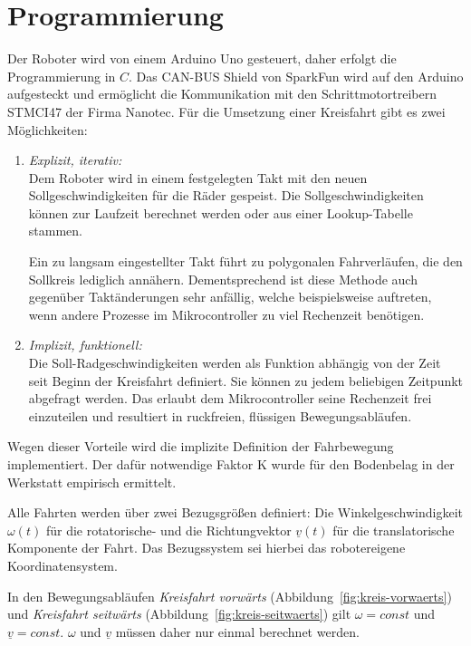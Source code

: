\documentclass[a4paper]{article}
\begin{document}
\section{Programmierung}
Der Roboter wird von einem Arduino Uno gesteuert, daher erfolgt die Programmierung in $C$. Das CAN-BUS Shield von SparkFun wird auf den Arduino aufgesteckt und ermöglicht die Kommunikation mit den Schrittmotortreibern STMCI47 der Firma Nanotec.
Für die Umsetzung einer Kreisfahrt gibt es zwei Möglichkeiten:

\begin{enumerate}
\item \emph{Explizit, iterativ:} \\
Dem Roboter wird in einem festgelegten Takt mit den neuen Sollgeschwindigkeiten für die Räder gespeist. Die Sollgeschwindigkeiten können zur Laufzeit berechnet werden oder aus einer Lookup-Tabelle stammen.

Ein zu langsam eingestellter Takt führt zu polygonalen Fahrverläufen, die den Sollkreis lediglich annähern. Dementsprechend ist diese Methode auch gegenüber Taktänderungen sehr anfällig, welche beispielsweise auftreten, wenn andere Prozesse im Mikrocontroller zu viel Rechenzeit benötigen.

\item \emph{Implizit, funktionell:} \\
Die Soll-Radgeschwindigkeiten werden als Funktion abhängig von der Zeit seit Beginn der Kreisfahrt definiert. Sie können zu jedem beliebigen Zeitpunkt abgefragt werden. Das erlaubt dem Mikrocontroller seine Rechenzeit frei einzuteilen und resultiert in ruckfreien, flüssigen Bewegungsabläufen.
\end{enumerate}

Wegen dieser Vorteile wird die implizite Definition der Fahrbewegung implementiert.
Der dafür notwendige Faktor K wurde für den Bodenbelag in der Werkstatt empirisch ermittelt.

Alle Fahrten werden über zwei Bezugsgrößen definiert: Die Winkelgeschwindigkeit $\omega(t)$ für die rotatorische- und die Richtungvektor $\underline{v}(t)$ für die translatorische Komponente der Fahrt. Das Bezugssystem sei hierbei das robotereigene Koordinatensystem.

In den Bewegungsabläufen \emph{Kreisfahrt vorwärts} (Abbildung~\ref{fig:kreis-vorwaerts}) und \emph{Kreisfahrt seitwärts} (Abbildung~\ref{fig:kreis-seitwaerts}) gilt $\omega = const$ und $\underline{v} = const$. $\omega$ und $\underline{v}$ müssen daher nur einmal berechnet werden.
\end{document}
